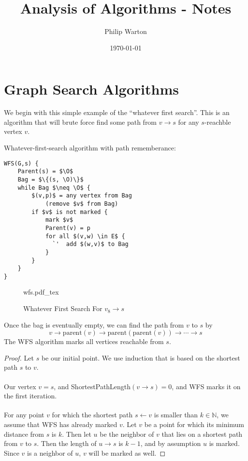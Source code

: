 \documentclass{article}
\newcommand{\incfig}[1]{%
    \def\svgwidth{.5\linewidth}
    {#1.pdf_tex}
}
\theoremstyle{definition}
\begin{document}
\title{Analysis of Algorithms - Notes}
\author{Philip Warton}
\date{\today}
\maketitle
\section{Graph Search Algorithms}
We begin with this simple example of the ``whatever first search''. This is an algorithm that will brute force find some
path from $v \rightarrow s$ for any $s$-reachble vertex $v$.
\begin{mdframed}
    Whatever-first-search algorithm with path rememberance:
    \begin{lstlisting}[mathescape=true]
WFS(G,s) {
    Parent(s) = $\O$
    Bag = $\{(s, \O)\}$
    while Bag $\neq \O$ {
        $(v,p)$ = any vertex from Bag
            (remove $v$ from Bag)
        if $v$ is not marked {
            mark $v$
            Parent(v) = p
            for all $(v,w) \in E$ {
              `'  add $(w,v)$ to Bag
            }
        }
    }
}
    \end{lstlisting}
\end{mdframed}
\begin{figure}[ht]
    \centering
    \incfig{wfs}
    \caption{Whatever First Search For $v_8 \rightarrow s$}
    \label{fig:wfs}
\end{figure}
Once the bag is eventually empty, we can find the path from 
$v$ to $s$ by
\[
    v \rightarrow \text{parent}(v) \rightarrow \text{parent}(\text{parent}(v)) \rightarrow \cdots \rightarrow s
\]
The WFS algorithm marks all vertices reachable from $s$.
\begin{proof}
    Let $s$ be our initial point. We use induction that is based on the shortest path $s$ to $v$. \\\\
     Our vertex $v = s$, and ShortestPathLength$(v\rightarrow s) = 0$, and WFS marks it on the first iteration.\\\\
     For any point $v$ for which the shortest path $s \leftarrow v$ is smaller than $k \in \mathbb{N}$,
    we assume that WFS has already marked $v$. Let $v$ be a point for which its minimum distance from $s$ is $k$.
    Then let $u$ be the neighbor of $v$ that lies on 
    a shortest path from $v$ to $s$. Then the length of $u \rightarrow s$ is $k-1$, and by assumption $u$ is marked.
    Since $v$ is a neighbor of $u$, $v$ will be marked as well.
\end{proof}
\end{document}

